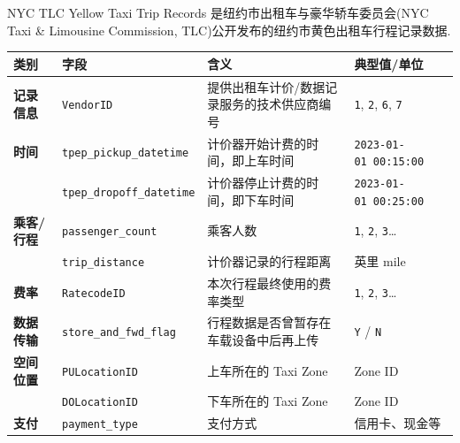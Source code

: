 \documentclass[11pt]{article}
\begin{document}
    NYC TLC Yellow Taxi Trip Records 是纽约市出租车与豪华轿车委员会(NYC Taxi
\& Limousine Commission, TLC)公开发布的纽约市黄色出租车行程记录数据.

{\def\LTcaptype{none} %
\begin{longtable}[]{@{}
  >{\centering\arraybackslash}p{}
  >{\centering\arraybackslash}p{}
  >{\centering\arraybackslash}p{}
  >{\centering\arraybackslash}p{}@{}}
\toprule\noalign{}
\begin{minipage}[b]{\linewidth}\centering
类别
\end{minipage} & \begin{minipage}[b]{\linewidth}\centering
字段
\end{minipage} & \begin{minipage}[b]{\linewidth}\centering
含义
\end{minipage} & \begin{minipage}[b]{\linewidth}\centering
典型值/单位
\end{minipage} \\
\midrule\noalign{}
\endhead
\bottomrule\noalign{}
\endlastfoot
\textbf{记录信息} & \texttt{VendorID} &
提供出租车计价/数据记录服务的技术供应商编号 & \texttt{1}, \texttt{2},
\texttt{6}, \texttt{7} \\
\textbf{时间} & \texttt{tpep\_pickup\_datetime} &
计价器开始计费的时间，即上车时间 & \texttt{2023-01-01\ 00:15:00} \\
& \texttt{tpep\_dropoff\_datetime} & 计价器停止计费的时间，即下车时间 &
\texttt{2023-01-01\ 00:25:00} \\
\textbf{乘客/行程} & \texttt{passenger\_count} & 乘客人数 & \texttt{1},
\texttt{2}, \texttt{3}\ldots{} \\
& \texttt{trip\_distance} & 计价器记录的行程距离 & 英里 mile \\
\textbf{费率} & \texttt{RatecodeID} & 本次行程最终使用的费率类型 &
\texttt{1}, \texttt{2}, \texttt{3}\ldots{} \\
\textbf{数据传输} & \texttt{store\_and\_fwd\_flag} &
行程数据是否曾暂存在车载设备中后再上传 & \texttt{Y} / \texttt{N} \\
\textbf{空间位置} & \texttt{PULocationID} & 上车所在的 Taxi Zone & Zone
ID \\
& \texttt{DOLocationID} & 下车所在的 Taxi Zone & Zone ID \\
\textbf{支付} & \texttt{payment\_type} & 支付方式 & 信用卡、现金等 \\

\end{longtable}}
\end{document}
